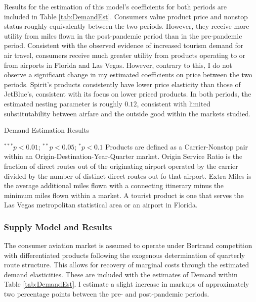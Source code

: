 \documentclass{article}
\begin{document}
    Results for the estimation of this model's coefficients for both periods are included in Table \ref{tab:DemandEst}. Consumers value product price and nonstop status roughly equivalently between the two periods. However, they receive more utility from miles flown in the post-pandemic period than in the pre-pandemic period. Consistent with the observed evidence of increased tourism demand for air travel, consumers receive much greater utility from products operating to or from airports in Florida and Las Vegas. However, contrary to this, I do not observe a significant change in my estimated coefficients on price between the two periods. Spirit's products consistently have lower price elasticity than those of JetBlue's, consistent with its focus on lower priced products. In both periods, the estimated nesting parameter is roughly $0.12$, consistent with limited substitutability between airfare and the outside good within the markets studied.

    \begin{table}
        \caption{Demand Estimation Results}
        \label{tab:DemandEst}
        \vspace{-15mm}
        \begin{center}
        
                \footnotesize{$^{***}p<0.01$; $^{**}p<0.05$; $^{*}p<0.1$ Products are defined as a Carrier-Nonstop pair within an Origin-Destination-Year-Quarter market. Origin Service Ratio is the fraction of direct routes out of the originating airport operated by the carrier divided by the number of distinct direct routes out fo that airport. Extra Miles is the average additional miles flown with a connecting itinerary minus the minimum miles flown within a market.  A tourist product is one that serves the Las Vegas metropolitan statistical area or an airport in Florida.}

        \end{center}
    \end{table}
		
	\subsubsection{Supply Model and Results}
	\label{sec:Analysis_Supply}
	The consumer aviation market is assumed to operate under Bertrand competition with differentiated products following the exogenous determination of quarterly route structure. This allows for recovery of marginal costs through the estimated demand elasticities.  These are included with the estimates of Demand within Table \ref{tab:DemandEst}. I estimate a slight increase in markups of approximately two percentage points between the pre- and post-pandemic periods. 
	
\end{document}
